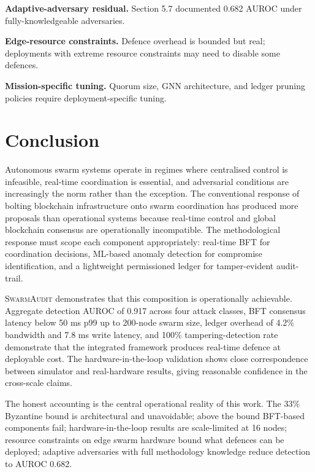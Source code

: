\documentclass[sigconf,nonacm]{acmart}
\begin{document}
\textbf{Adaptive-adversary residual.} Section 5.7 documented
0.682 AUROC under fully-knowledgeable adversaries.

\textbf{Edge-resource constraints.} Defence overhead is bounded
but real; deployments with extreme resource constraints may need
to disable some defences.

\textbf{Mission-specific tuning.} Quorum size, GNN architecture,
and ledger pruning policies require deployment-specific tuning.

\section{Conclusion}

Autonomous swarm systems operate in regimes where centralised
control is infeasible, real-time coordination is essential, and
adversarial conditions are increasingly the norm rather than the
exception. The conventional response of bolting blockchain
infrastructure onto swarm coordination has produced more proposals
than operational systems because real-time control and global
blockchain consensus are operationally incompatible. The
methodological response must scope each component appropriately:
real-time BFT for coordination decisions, ML-based anomaly
detection for compromise identification, and a lightweight
permissioned ledger for tamper-evident audit-trail.

\textsc{SwarmAudit} demonstrates that this composition is
operationally achievable. Aggregate detection AUROC of 0.917
across four attack classes, BFT consensus latency below 50 ms p99
up to 200-node swarm size, ledger overhead of 4.2\% bandwidth and
7.8 ms write latency, and 100\% tampering-detection rate
demonstrate that the integrated framework produces real-time
defence at deployable cost. The hardware-in-the-loop validation
shows close correspondence between simulator and real-hardware
results, giving reasonable confidence in the cross-scale claims.

The honest accounting is the central operational reality of this
work. The 33\% Byzantine bound is architectural and unavoidable;
above the bound BFT-based components fail; hardware-in-the-loop
results are scale-limited at 16 nodes; resource constraints on
edge swarm hardware bound what defences can be deployed; adaptive
adversaries with full methodology knowledge reduce detection to
AUROC 0.682.
\end{document}
